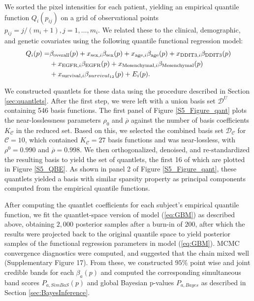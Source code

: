 \documentclass[11pt]{article}
\begin{document}
We sorted the pixel intensities for each patient, yielding an empirical quantile function $Q_i(p_{ij})$ on a grid of observational points $p_{ij}=j/(m_i+1), j=1, \ldots, m_i$.  We related these to the clinical, demographic, and genetic covariates using the following quantile functional regression model:
 \begin{eqnarray}
 \label{eq:GBM}
Q_i(p)=&\beta_{\text{overall}}(p) + x_{\text{sex},i}\beta_{\text{sex}}(p) 
 +x_{\text{age},i}\beta_{\text{age}}(p) +x_{\text{DDIT3},i}\beta_{\text{DDIT3}}(p)     \notag \\
&  +x_{\text{EGFR},i}\beta_{\text{EGFR}}(p)  + x_{\text{Mesenchymal},i}\beta_{\text{Mesenchymal}}(p)  \notag \\
& 
+ x_{\text{survival},i}\beta_{ survival_{12}}(p) 
  +  E_i(p).
\end{eqnarray}

We constructed quantlets for these data using the procedure described in Section \ref{sec:quantlets}.  After the first step, we were left with a union basis set $\mathcal{D}^U$ containing 546 basis functions.   The first panel of Figure \ref{S5_Figure_qant} plots the near-losslessness parameters $\rho_0$ and $\overline{\rho}$ %
against the number of basis coefficients $K_\mathcal{C}$ in the reduced set.  Based on this, we selected the combined basis set $\mathcal{D}_\mathcal{C}$ for $\mathcal{C}=10$, which contained $K_\mathcal{C}=27$ basis functions and was near-lossless, with $\rho^0=0.990$ and $\overline{\rho}=0.998$.  We then orthogonalized, denoised, and re-standardized the resulting basis to yield the set of quantlets, the first 16 of which are plotted in Figure \ref{S5_QBE}.  As shown in panel 2 of Figure \ref{S5_Figure_qant}, these quantlets yielded a basis with similar sparsity property as principal components computed from the empirical quantile functions.

After computing the quantlet coefficients for each subject's empirical quantile function, we fit the quantlet-space version of model (\ref{eq:GBM}) as described above, obtaining $2,000$ posterior samples after a burn-in of $200$, after which the results were projected back to the original quantile space to yield posterior samples of the functional regression parameters in model (\ref{eq:GBM}).  MCMC convergence diagnostics were computed, and suggested that the chain mixed well (Supplementary Figure 17).  From these, we constructed $95\%$ point wise and joint credible bands for each $\beta_a(p)$ and computed the corresponding simultaneous band scores $P_{a,SimBaS}(p)$ and global Bayesian p-values $P_{a,Bayes}$ as described in Section \ref{sec:BayesInference}.  
\end{document}
